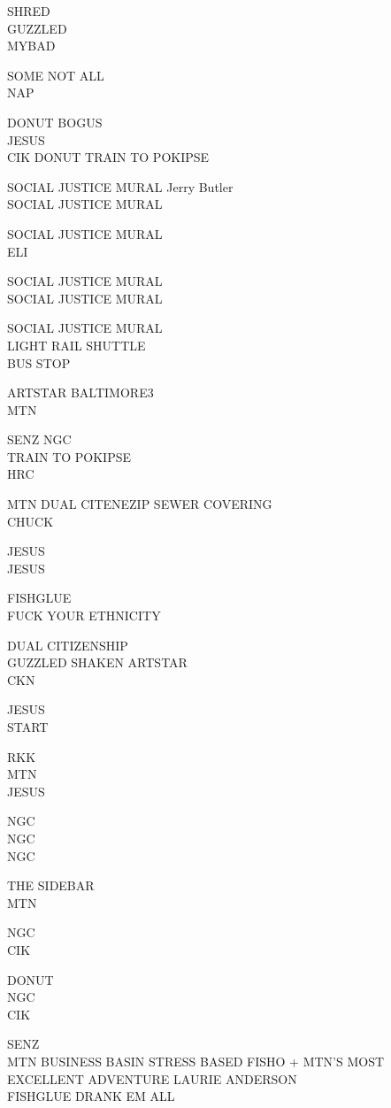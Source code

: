 \documentclass[10pt,letterpaper]{article}
\begin{document}
SHRED\\
GUZZLED\\
MYBAD

SOME NOT ALL\\
NAP

DONUT BOGUS\\
JESUS\\
CIK DONUT TRAIN TO POKIPSE

SOCIAL JUSTICE MURAL Jerry Butler\\
SOCIAL JUSTICE MURAL

SOCIAL JUSTICE MURAL\\
ELI

SOCIAL JUSTICE MURAL\\
SOCIAL JUSTICE MURAL

SOCIAL JUSTICE MURAL\\
LIGHT RAIL SHUTTLE\\
BUS STOP

ARTSTAR BALTIMORE3\\
MTN

SENZ NGC\\
TRAIN TO POKIPSE\\
HRC

MTN DUAL CITENEZIP SEWER COVERING\\
CHUCK

JESUS\\
JESUS

FISHGLUE\\
FUCK YOUR ETHNICITY

DUAL CITIZENSHIP\\
GUZZLED SHAKEN ARTSTAR\\
CKN

JESUS\\
START

RKK\\
MTN\\
JESUS

NGC\\
NGC\\
NGC

THE SIDEBAR\\
MTN

NGC\\
CIK

DONUT\\
NGC\\
CIK

SENZ\\
MTN BUSINESS BASIN STRESS BASED FISHO + MTN'S MOST EXCELLENT ADVENTURE LAURIE ANDERSON\\
FISHGLUE DRANK EM ALL
\end{document}
